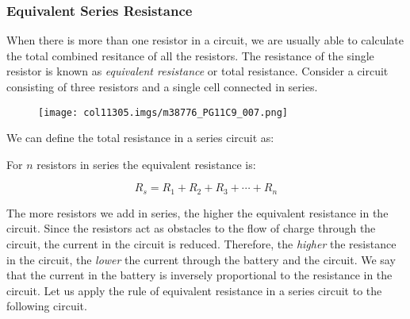             \subsubsection{ Equivalent Series Resistance}
            \nopagebreak
            \label{m38776*id63926}When there is more than one resistor in a circuit, we are usually able to calculate the total combined resitance of all the resistors. The resistance of the single resistor is known as \textsl{equivalent resistance} or total resistance.
Consider a circuit consisting of three resistors and a single cell connected in series.\par 
          \label{m38776*id63930}
    \setcounter{subfigure}{0}
	\begin{figure}[H] %
    \begin{center}
    \label{m38776*id63934!!!underscore!!!media}\label{m38776*id63934!!!underscore!!!printimage}\texttt{[image: col11305.imgs/m38776\_PG11C9\_007.png]} %
      \vspace{2pt}
    \vspace{.1in}
    \end{center}
 \end{figure}       
          \par 
\label{m38776*eip-546}We can define the total resistance in a series circuit as:\par \label{m38776*fhsst!!!underscore!!!id788}
	 { \label{m38776*meaningfhsst!!!underscore!!!id788}
          \label{m38776*id64628}For $n$ resistors in series the equivalent resistance is:\par 
          \label{m38776*uid2532}\nopagebreak\noindent{}
            
    \begin{equation}
    {R}_{s}={R}_{1}+{R}_{2}+{R}_{3}+\cdots +{R}_{n}\tag{16.31}
      \end{equation}
           } 
          \label{m38776*id64719}The more resistors we add in series, the higher the equivalent resistance in the circuit. Since the resistors act as obstacles to the flow of charge through the circuit, the current in the circuit is reduced. Therefore, the \textsl{higher} the resistance in the circuit, the \textsl{lower} the current through the battery and the circuit. We say that the current in the battery is inversely proportional to the resistance in the circuit. 
Let us apply the rule of equivalent resistance in a series circuit to the following circuit.\par 
